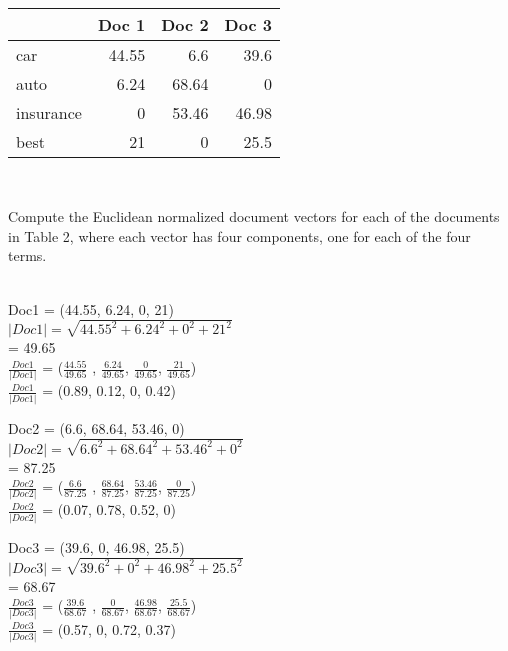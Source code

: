 \documentclass[addpoints]{exam}
\begin{document}
\begin{questions}
  \begin{solution} \\
  	\begin{center}
    	\begin{tabular}{|l|r|r|r|}
   	\hline
   	& Doc 1 & Doc 2 & Doc 3\\\hline
   	car & 44.55 & 6.6 & 39.6\\
   	auto & 6.24 & 68.64 & 0 \\
   	insurance & 0 & 53.46 & 46.98 \\
   	best & 21 & 0 & 25.5 \\\hline
   		\end{tabular}\\
  \end{center}
\end{solution}
\newpage
  \question[10]
  \label{q:weights}
  Compute the Euclidean normalized document vectors for each of the documents in Table 2, where each vector has four components, one for each of the four terms.

  \begin{solution}\\
    Doc1 = (44.55, 6.24, 0, 21)\\
    $\left| Doc1 \right| = \sqrt{44.55^2+6.24^2+0^2+21^2}$\\
    = 49.65\\
    $\frac{Doc1}{\left| Doc1 \right|}$  = ($\frac{44.55}{49.65}$ , $\frac{6.24}{49.65}$, $\frac{0}{49.65}$, $\frac{21}{49.65}$)\\
    $\frac{Doc1}{\left| Doc1 \right|}$ = (0.89, 0.12, 0, 0.42)
    \newline
    
    
    Doc2 = (6.6, 68.64, 53.46, 0)\\
    $\left| Doc2 \right| = \sqrt{6.6^2+68.64^2+53.46^2+0^2}$\\
    = 87.25\\
        $\frac{Doc2}{\left| Doc2 \right|}$  = ($\frac{6.6}{87.25}$ , $\frac{68.64}{87.25}$, $\frac{53.46}{87.25}$, $\frac{0}{87.25}$)\\
    $\frac{Doc2}{\left| Doc2 \right|}$ = (0.07, 0.78, 0.52, 0) \newline
    
    Doc3 = (39.6, 0, 46.98, 25.5)\\
    $\left| Doc3 \right| = \sqrt{39.6^2+0^2+46.98^2+25.5^2}$\\
    = 68.67 \\
        $\frac{Doc3}{\left| Doc3 \right|}$  = ($\frac{39.6}{68.67}$ , $\frac{0}{68.67}$, $\frac{46.98}{68.67}$, $\frac{25.5}{68.67}$)\\
    $\frac{Doc3}{\left| Doc3 \right|}$ = (0.57, 0, 0.72, 0.37)
    \newline
    

\end{solution}
\end{questions}
\end{document}
